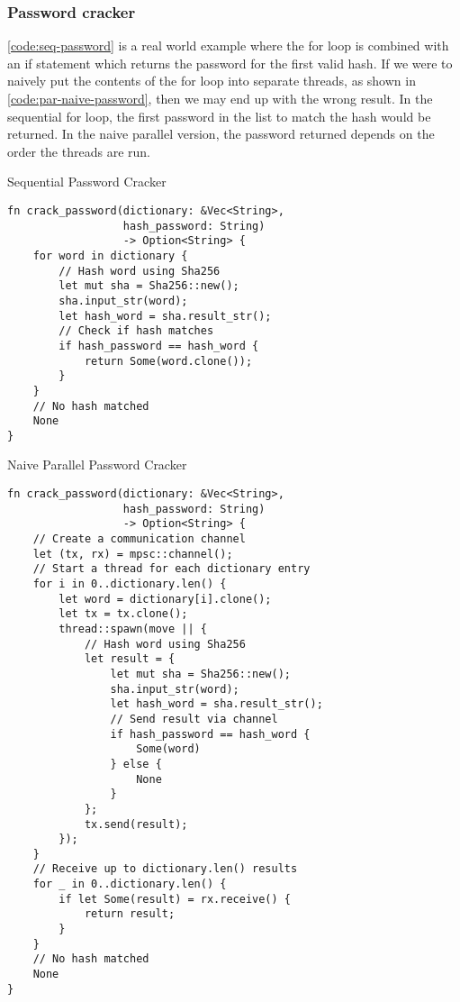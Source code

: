 \documentclass[conference]{IEEEtran}
\begin{document}
\subsubsection{Password cracker}
\autoref{code:seq-password} is a real world example where the for loop is combined with an if statement which returns the password for the first valid hash. If we were to naively put the contents of the for loop into separate threads, as shown in \autoref{code:par-naive-password}, then we may end up with the wrong result. In the sequential for loop, the first password in the list to match the hash would be returned. In the naive parallel version, the password returned depends on the order the threads are run.

\begin{algorithm}
\caption{Sequential Password Cracker}
\label{code:seq-password}
\begin{verbatim}
fn crack_password(dictionary: &Vec<String>,
                  hash_password: String)
                  -> Option<String> {
    for word in dictionary {
        // Hash word using Sha256
        let mut sha = Sha256::new();
        sha.input_str(word);
        let hash_word = sha.result_str();
        // Check if hash matches
        if hash_password == hash_word {
            return Some(word.clone());
        }
    }
    // No hash matched
    None
}
\end{verbatim}
\end{algorithm}

\begin{algorithm}
\caption{Naive Parallel Password Cracker}
\label{code:par-naive-password}
\begin{verbatim}
fn crack_password(dictionary: &Vec<String>,
                  hash_password: String)
                  -> Option<String> {
    // Create a communication channel
    let (tx, rx) = mpsc::channel();
    // Start a thread for each dictionary entry
    for i in 0..dictionary.len() {
        let word = dictionary[i].clone();
        let tx = tx.clone();
        thread::spawn(move || {
            // Hash word using Sha256
            let result = {
                let mut sha = Sha256::new();
                sha.input_str(word);
                let hash_word = sha.result_str();
                // Send result via channel
                if hash_password == hash_word {
                    Some(word)
                } else {
                    None
                }
            };
            tx.send(result);
        });
    }
    // Receive up to dictionary.len() results
    for _ in 0..dictionary.len() {
        if let Some(result) = rx.receive() {
            return result;
        }
    }
    // No hash matched
    None
}
\end{verbatim}
\end{algorithm}
\end{document}
